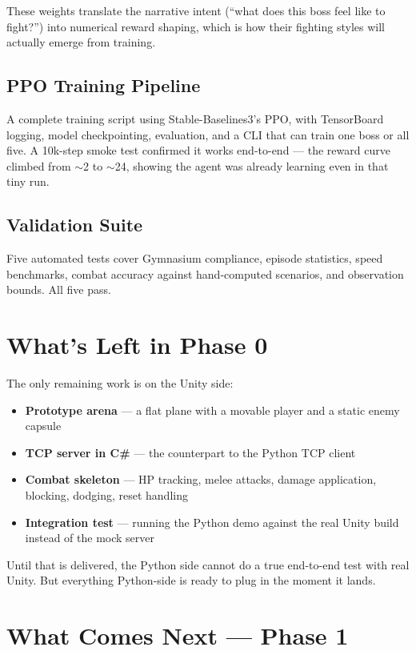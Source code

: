 \documentclass[11pt]{article}
\begin{document}
These weights translate the narrative intent (``what does this boss feel like to fight?'') into numerical reward shaping, which is how their fighting styles will actually emerge from training.

\subsection*{PPO Training Pipeline}
A complete training script using Stable-Baselines3's PPO, with TensorBoard logging, model checkpointing, evaluation, and a CLI that can train one boss or all five. A 10k-step smoke test confirmed it works end-to-end --- the reward curve climbed from $\sim$2 to $\sim$24, showing the agent was already learning even in that tiny run.

\subsection*{Validation Suite}
Five automated tests cover Gymnasium compliance, episode statistics, speed benchmarks, combat accuracy against hand-computed scenarios, and observation bounds. All five pass.

\section*{What's Left in Phase 0}

The only remaining work is on the Unity side:
\begin{itemize}[leftmargin=*]
    \item \textbf{Prototype arena} --- a flat plane with a movable player and a static enemy capsule
    \item \textbf{TCP server in C\#} --- the counterpart to the Python TCP client
    \item \textbf{Combat skeleton} --- HP tracking, melee attacks, damage application, blocking, dodging, reset handling
    \item \textbf{Integration test} --- running the Python demo against the real Unity build instead of the mock server
\end{itemize}

Until that is delivered, the Python side cannot do a true end-to-end test with real Unity. But everything Python-side is ready to plug in the moment it lands.

\section*{What Comes Next --- Phase 1}
\end{document}
